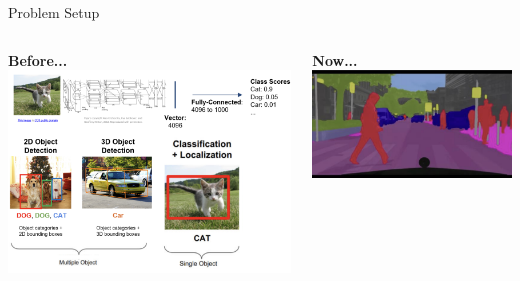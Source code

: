 \documentclass[serif, aspectratio=169]{beamer}
\begin{document}
\begin{frame}{Problem Setup}
    \vspace{-0.1cm}

    \begin{columns}[t] %
        \begin{column}{0.5\textwidth}
            \textbf{Before...} %
            \vspace{0.2cm}
            \includegraphics[width=\textwidth]{pic/SS problem setup before.png}
        \end{column}
        
        \begin{column}{0.5\textwidth}
            \textbf{Now...}
            \vspace{0.2cm}
            \includegraphics[width=\textwidth]{pic/SS problem setup now1.png} 
        \end{column}
    \end{columns}
    

\end{frame}
\end{document}
